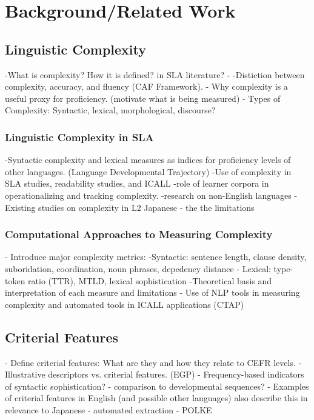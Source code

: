 \chapter{Background/Related Work}

\section{Linguistic Complexity}
-What is complexity? How it is defined? in SLA literature?
    -
-Distiction between complexity, accuracy, and fluency (CAF Framework).
- Why complexity is a useful proxy for proficiency. (motivate what is being measured)
- Types of Complexity: Syntactic, lexical, morphological, discourse?


\subsection{Linguistic Complexity in SLA}
-Syntactic complexity and lexical measures as indices for proficiency levels of other languages. (Language Developmental Trajectory)
-Use of complexity in SLA studies, readability studies, and ICALL
-role of learner corpora in operationalizing and tracking complexity.
-research on non-English languages
-Existing studies on complexity in L2 Japanese - the the limitations


\subsection{Computational Approaches to Measuring Complexity}
- Introduce major complexity metrics:
    -Syntactic: sentence length, clause density, suboridation, coordination, noun phrases, depedency distance
    - Lexical: type-token ratio (TTR), MTLD, lexical sophistication
-Theoretical basis and interpretation of each measure and limitations
- Use of NLP tools in measuring complexity and automated tools in ICALL applications (CTAP)

\section{Criterial Features}
- Define criterial features: What are they and how they relate to CEFR levels.
- Illustrative descriptors vs. criterial features. (EGP)
- Frequency-based indicators of syntactic sophistication? \cite{Ellis2004}
    - comparison to developmental sequences?
- Examples of criterial features in English (and possible other languages) also describe this in relevance to Japanese
- automated extraction - POLKE


